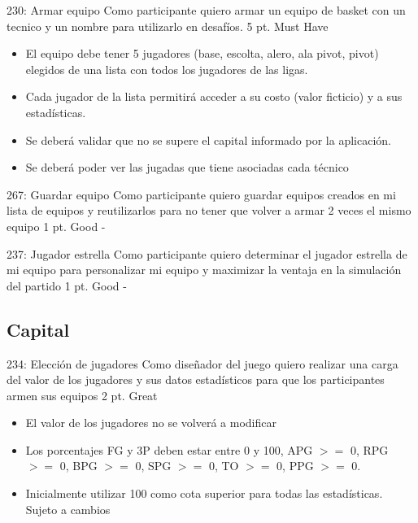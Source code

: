\simplestory
{230: Armar equipo}
{Como participante quiero armar un equipo de basket con un tecnico y un nombre para utilizarlo en desafíos.}
{5 pt.}
{Must Have}
{\begin{itemize}
\item El equipo debe tener 5 jugadores (base, escolta, alero, ala pivot, pivot) elegidos de una lista con todos los jugadores de las ligas.
\item Cada jugador de la lista permitirá acceder a su costo (valor ficticio) y a sus estadísticas.
\item Se deberá validar que no se supere el capital informado por la aplicación.
\item Se deberá poder ver las jugadas que tiene asociadas cada técnico
\end{itemize}}

\vspace{1cm}

\simplestory
{267: Guardar equipo}
{Como participante quiero guardar equipos creados en mi lista de equipos y reutilizarlos para no tener que volver a armar 2 veces el mismo equipo}
{1 pt.}
{Good}
{-}

\vspace{1cm}

\simplestory
{237: Jugador estrella}
{Como participante quiero determinar el jugador estrella de mi equipo para personalizar mi equipo y maximizar la ventaja en la simulación del partido}
{1 pt.}
{Good}
{-}

\vspace{1cm}

\subsection{Capital}

\simplestory
{234: Elección de jugadores}
{Como diseñador del juego quiero realizar una carga del valor de los jugadores y sus datos estadísticos para que los participantes armen sus equipos}
{2 pt.}
{Great}
{\begin{itemize}
\item El valor de los jugadores no se volverá a modificar
\item Los porcentajes FG y 3P deben estar entre 0 y 100, APG $>=$ 0, RPG $>=$ 0, BPG $>=$ 0, SPG $>=$ 0, TO $>=$ 0, PPG $>=$ 0.
\item Inicialmente utilizar 100 como cota superior para todas las estadísticas. Sujeto a cambios
\end{itemize}}

